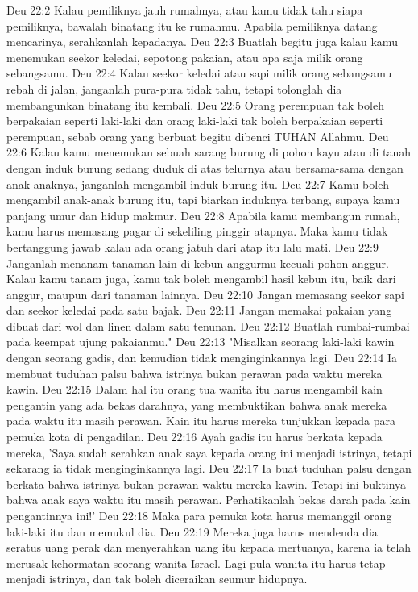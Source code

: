 Deu 22:2  Kalau pemiliknya jauh rumahnya, atau kamu tidak tahu siapa pemiliknya, bawalah binatang itu ke rumahmu. Apabila pemiliknya datang mencarinya, serahkanlah kepadanya.
Deu 22:3  Buatlah begitu juga kalau kamu menemukan seekor keledai, sepotong pakaian, atau apa saja milik orang sebangsamu.
Deu 22:4  Kalau seekor keledai atau sapi milik orang sebangsamu rebah di jalan, janganlah pura-pura tidak tahu, tetapi tolonglah dia membangunkan binatang itu kembali.
Deu 22:5  Orang perempuan tak boleh berpakaian seperti laki-laki dan orang laki-laki tak boleh berpakaian seperti perempuan, sebab orang yang berbuat begitu dibenci TUHAN Allahmu.
Deu 22:6  Kalau kamu menemukan sebuah sarang burung di pohon kayu atau di tanah dengan induk burung sedang duduk di atas telurnya atau bersama-sama dengan anak-anaknya, janganlah mengambil induk burung itu.
Deu 22:7  Kamu boleh mengambil anak-anak burung itu, tapi biarkan induknya terbang, supaya kamu panjang umur dan hidup makmur.
Deu 22:8  Apabila kamu membangun rumah, kamu harus memasang pagar di sekeliling pinggir atapnya. Maka kamu tidak bertanggung jawab kalau ada orang jatuh dari atap itu lalu mati.
Deu 22:9  Janganlah menanam tanaman lain di kebun anggurmu kecuali pohon anggur. Kalau kamu tanam juga, kamu tak boleh mengambil hasil kebun itu, baik dari anggur, maupun dari tanaman lainnya.
Deu 22:10  Jangan memasang seekor sapi dan seekor keledai pada satu bajak.
Deu 22:11  Jangan memakai pakaian yang dibuat dari wol dan linen dalam satu tenunan.
Deu 22:12  Buatlah rumbai-rumbai pada keempat ujung pakaianmu."
Deu 22:13  "Misalkan seorang laki-laki kawin dengan seorang gadis, dan kemudian tidak menginginkannya lagi.
Deu 22:14  Ia membuat tuduhan palsu bahwa istrinya bukan perawan pada waktu mereka kawin.
Deu 22:15  Dalam hal itu orang tua wanita itu harus mengambil kain pengantin yang ada bekas darahnya, yang membuktikan bahwa anak mereka pada waktu itu masih perawan. Kain itu harus mereka tunjukkan kepada para pemuka kota di pengadilan.
Deu 22:16  Ayah gadis itu harus berkata kepada mereka, 'Saya sudah serahkan anak saya kepada orang ini menjadi istrinya, tetapi sekarang ia tidak menginginkannya lagi.
Deu 22:17  Ia buat tuduhan palsu dengan berkata bahwa istrinya bukan perawan waktu mereka kawin. Tetapi ini buktinya bahwa anak saya waktu itu masih perawan. Perhatikanlah bekas darah pada kain pengantinnya ini!'
Deu 22:18  Maka para pemuka kota harus memanggil orang laki-laki itu dan memukul dia.
Deu 22:19  Mereka juga harus mendenda dia seratus uang perak dan menyerahkan uang itu kepada mertuanya, karena ia telah merusak kehormatan seorang wanita Israel. Lagi pula wanita itu harus tetap menjadi istrinya, dan tak boleh diceraikan seumur hidupnya.
